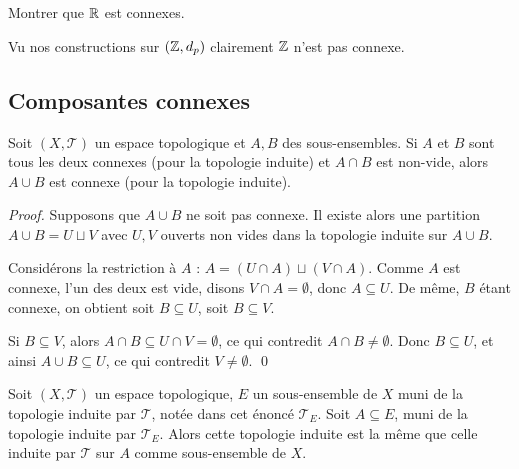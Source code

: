 \begin{exercice}
    Montrer que $\mathbb{R}$ est connexes.
\end{exercice}

\begin{remarque}
    Vu nos constructions sur $(\mathbb{Z}, d_p)$ clairement $\mathbb{Z}$ n'est pas connexe.
\end{remarque}

 \subsection{Composantes connexes}


\begin{lemme}
Soit $(X, \mathcal{T})$ un espace topologique et $A, B$ des sous-ensembles.
Si $A$ et $B$ sont tous les deux connexes (pour la topologie induite) et $A \cap B$
est non-vide, alors $A \cup B$ est connexe (pour la topologie induite).
\end{lemme}

\begin{proof}
Supposons que $A \cup B$ ne soit pas connexe. Il existe alors une partition
$A \cup B = U \sqcup V$ avec $U, V$ ouverts non vides dans la topologie induite
sur $A \cup B$.

Considérons la restriction à $A$ : $A = (U \cap A) \sqcup (V \cap A)$. Comme $A$
est connexe, l'un des deux est vide, disons $V \cap A = \emptyset$, donc $A \subseteq U$.
De même, $B$ étant connexe, on obtient soit $B \subseteq U$, soit $B \subseteq V$.

Si $B \subseteq V$, alors $A \cap B \subseteq U \cap V = \emptyset$, ce qui contredit
$A \cap B \neq \emptyset$. Donc $B \subseteq U$, et ainsi $A \cup B \subseteq U$,
ce qui contredit $V \neq \emptyset$. \qed
\end{proof}


\begin{lemme}
Soit $(X, \mathcal{T})$ un espace topologique, $E$ un sous-ensemble de $X$ muni
de la topologie induite par $\mathcal{T}$, notée dans cet énoncé $\mathcal{T}_E$.
Soit $A \subseteq E$, muni de la topologie induite par $\mathcal{T}_E$. Alors cette
topologie induite est la même que celle induite par $\mathcal{T}$ sur $A$ comme
sous-ensemble de $X$.
\end{lemme}

